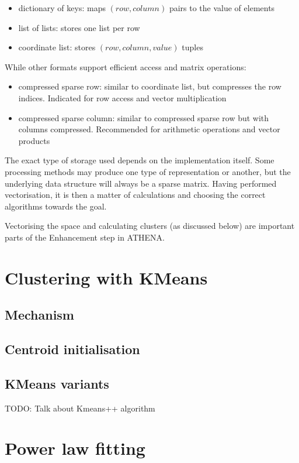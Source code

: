 \documentclass[12pt,a4paper,twoside]{report}
\begin{document}
\begin{itemize}
\item dictionary of keys: maps $(row, column)$ pairs to the value of elements
\item list of lists: stores one list per row
\item coordinate list: stores $(row, column, value)$ tuples
\end{itemize}

While other formats support efficient access and matrix operations:

\begin{itemize}
\item compressed sparse row: similar to coordinate list, but compresses the row indices. Indicated for row access and vector multiplication
\item compressed sparse column: similar to compressed sparse row but with columns compressed. Recommended for arithmetic operations and vector products
\end{itemize}

The exact type of storage used depends on the implementation itself. Some processing methods may produce one type of representation or another, but the underlying data structure will always be a sparse matrix. Having performed vectorisation, it is then a matter of calculations and choosing the correct algorithms towards the goal.

Vectorising the space and calculating clusters (as discussed below) are important parts of the Enhancement step in ATHENA.

\section{Clustering with KMeans}
\subsection{Mechanism}
\subsection{Centroid initialisation}
\subsection{KMeans variants}

\label{kmeansplusplus}
TODO: Talk about Kmeans++ algorithm

\section{Power law fitting}
\end{document}
